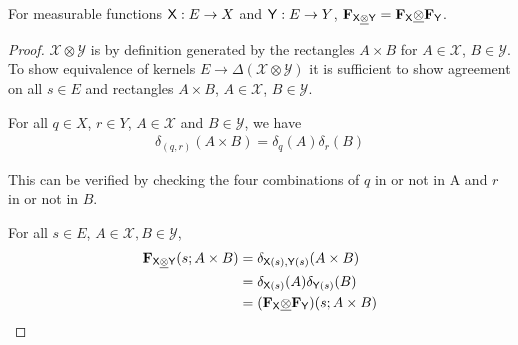 


\begin{lemma}\label{lem:thing_commutes}
For measurable functions $\mathsf{X}:E\to X$ and $\mathsf{Y}:E\to Y$, $\mathbf{F}_{\mathsf{X}\underline{\otimes}\mathsf{Y}}=\mathbf{F}_{\mathsf{X}}\underline{\otimes}\mathbf{F}_{\mathsf{Y}}$.
\end{lemma}

\begin{proof}
$\mathcal{X}\otimes\mathcal{Y}$ is by definition generated by the rectangles $A\times B$ for $A\in\mathcal{X}$, $B\in \mathcal{Y}$. To show equivalence of kernels $E\to \Delta(\mathcal{X}\otimes\mathcal{Y})$ it is sufficient to show agreement on all $s\in E$ and rectangles $A\times B$, $A\in \mathcal{X}$, $B\in \mathcal{Y}$.

For all $q\in X$, $r\in Y$, $A\in\mathcal{X}$ and $B\in \mathcal{Y}$, we have
\begin{align}
	\delta_{(q,r)}(A\times B) = \delta_q (A) \delta_r (B)
\end{align}

This can be verified by checking the four combinations of $q$ in or not in A and $r$ in or not in $B$.

For all $s\in E$, $A\in\mathcal{X},B\in\mathcal{Y}$,
\begin{align}
	\mathbf{F}_{\mathsf{X}\underline{\otimes}\mathsf{Y}}(s;A\times B) &= \delta_{\mathsf{X}(s),\mathsf{Y}(s)}(A\times B)\\
												  &= \delta_{\mathsf{X}(s)}(A)\delta_{\mathsf{Y}(s)}(B)\\
												  &= (\mathbf{F}_{\mathsf{X}}\underline{\otimes} \mathbf{F}_{\mathsf{Y}})(s;A\times B)
\end{align}
\end{proof}

